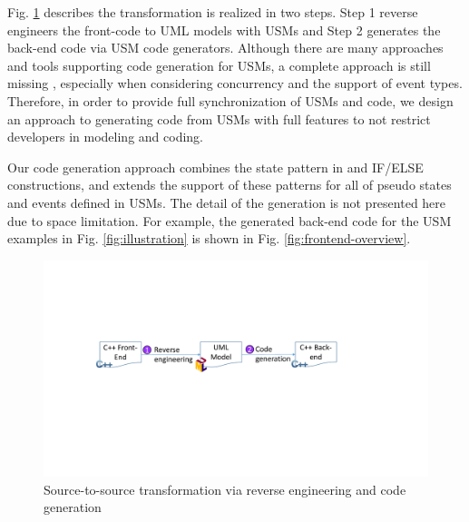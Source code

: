 Fig. \ref{fig:s2stransformation} describes the transformation is realized in two steps.
Step 1 reverse engineers the front-code to UML models with USMs and Step 2 generates the back-end code via USM code generators.
Although there are many approaches and tools supporting code generation for USMs, a complete approach is still missing \cite{Badreddin2014}, especially when considering concurrency and the support of event types.
Therefore, in order to provide full synchronization of USMs and code, we design an approach to generating code from USMs with full features to not restrict developers in modeling and coding. 

Our code generation approach combines the state pattern in \cite{niaz_mapping_2004} and IF/ELSE constructions, and extends the support of these patterns for all of pseudo states and events defined in USMs.
The detail of the generation is not presented here due to space limitation.
For example, the generated back-end code for the USM examples in Fig. \ref{fig:illustration} is shown in Fig. \ref{fig:frontend-overview}. 


\begin{figure}
	\centering
	\includegraphics[clip, trim=4.5cm 9.3cm 7.7cm 7.0cm, width=1.0\columnwidth]{figures/s2stransformation.pdf}
	\caption{Source-to-source transformation via reverse engineering and code generation} 
	\label{fig:s2stransformation}
\end{figure}